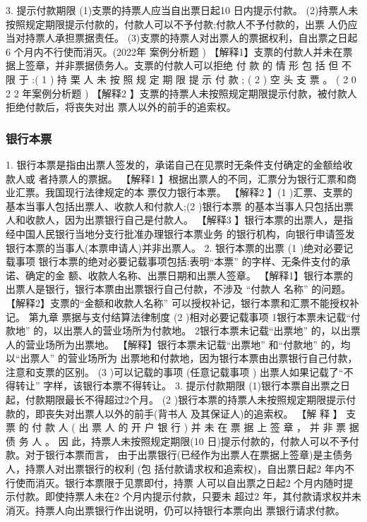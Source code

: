 \documentclass[UTF8,12pt]{ctexart}
\numberwithin{equation}{section} %
\numberwithin{figure}{section}
\numberwithin{table}{section}
\begin{document}
	3. 提示付款期限
	(1)支票的持票人应当自出票日起10 日内提示付款。
	(2)持票人未按照规定期限提示付款的，付款人可以不予付款;付款人不予付款的，出票 人仍应当对持票人承担票据责任。
	(3)支票的持票人对出票人的票据权利，自出票之日起6 个月内不行使而消灭。(2022年 案例分析题 )
	【解释1】支票的付款人并未在票据上签章，并非票据债务人。支票的付款人可以拒绝 付 款 的 情 形 包 括 但 不 限 于 :( 1 ) 持 栗 人 未 按 照 规 定 期 限 提 示 付 款 ; ( 2 ) 空 头 支 票 。 ( 2 0 2 2 年案例分析题 )
	【解释2 】支票的持票人未按照规定期限提示付款，被付款人拒绝付款后，将丧失对出 票人以外的前手的追索权。
	
	
	
	
	\subsubsection{银行本票}
	1. 银行本票是指由出票人签发的，承诺自己在见票时无条件支付确定的金额给收款人或 者持票人的票据。
	【解释1 】根据出票人的不同，汇票分为银行汇票和商业汇票。我国现行法律规定的本 票仅力银行本票。
	【解释2 】(1 )汇票、支票的基本当事人包括出票人、收款人和付款人;(2 )银行本票 的基本当事人只包括出票人和收款人，因为出票银行自己是付款人。
	【解释3 】银行本票的出票人，是指经中国人民银行当地分支行批准办理银行本票业务 的银行机构，向银行申请签发银行本票的当事人(本票申请人)并非出票人。
	2. 银行本票的出票
	(1 )绝对必要记载事项
	银行本票的绝对必要记载事项包括:表明“本票” 的字样、无条件支付的承诺、确定的金 额、收款人名称、出票日期和出票人签章。
	【解释1】银行本票的出票人是银行，银行本票由出票银行自己付款，不涉及 “付款人 名称” 的问题。
	【解释2】支票的“金额和收款人名称” 可以授权补记，银行本票和汇票不能授权补记。
	第九章 票据与支付结算法律制度 (2 )相对必要记载事项
	1银行本票未记载“付款地” 的，以出票人的营业场所为付款地。 2银行本票未记载“出票地” 的，以出票人的营业场所为出票地。
	【解释】银行本票未记载“出票地” 和“付款地” 的，均以“出票人” 的营业场所为 出票地和付款地，因为银行本票由出票银行自己付款，注意和支票的区别。
	(3 )可以记载的事项 (任意记载事项 )
	出票人如果记载了“不得转让” 字样，该银行本票不得转让。
	3. 提示付款期限
	(1)银行本票自出票之日起，付款期限最长不得超过2个月。
	(2 )银行本票的持票人未按照规定期限提示付款的，即丧失对出票人以外的前手(背书人 及其保证人)的追索权。
	【解 释 】 支 票 的 付 款 人 ( 出 票 人 的 开 户 银 行 ) 并 未 在 票 据 上 签 章 ， 并 非 票 据 债 务 人 。 因 此，持票人未按照规定期限(10 日)提示付款的，付款人可以不予付款。对于银行本票而言， 由于出票银行(已经作为出票人在票据上签章)是主债务人，持票人对出票银行的权利 (包 括付款请求权和追索权)，自出票日起2 年内不行使而消灭。银行本票限于见票即付，持票 人可以自出票之日起2 个月内随时提示付款。即使持票人未在2 个月内提示付款，只要未 超过2 年，其付款请求权并未消灭。持票人向出票银行作出说明，仍可以持银行本票向出 票银行请求付款。
	
\end{document}
